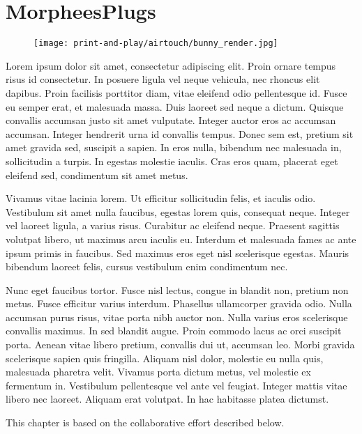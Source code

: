 \chapter{MorpheesPlugs} \label{ch:morphees}
  \begin{figure}[h]
    \centering
    \texttt{[image: print-and-play/airtouch/bunny\_render.jpg]}
  \end{figure}

  Lorem ipsum dolor sit amet, consectetur adipiscing elit. Proin ornare tempus
  risus id consectetur. In posuere ligula vel neque vehicula, nec rhoncus elit
  dapibus. Proin facilisis porttitor diam, vitae eleifend odio pellentesque id.
  Fusce eu semper erat, et malesuada massa. Duis laoreet sed neque a dictum.
  Quisque convallis accumsan justo sit amet vulputate. Integer auctor eros ac
  accumsan accumsan. Integer hendrerit urna id convallis tempus. Donec sem est,
  pretium sit amet gravida sed, suscipit a sapien. In eros nulla, bibendum nec
  malesuada in, sollicitudin a turpis. In egestas molestie iaculis. Cras eros
  quam, placerat eget eleifend sed, condimentum sit amet metus.

  Vivamus vitae lacinia lorem. Ut efficitur sollicitudin felis, et iaculis odio.
  Vestibulum sit amet nulla faucibus, egestas lorem quis, consequat neque.
  Integer vel laoreet ligula, a varius risus. Curabitur ac eleifend neque.
  Praesent sagittis volutpat libero, ut maximus arcu iaculis eu. Interdum et
  malesuada fames ac ante ipsum primis in faucibus. Sed maximus eros eget nisl
  scelerisque egestas. Mauris bibendum laoreet felis, cursus vestibulum enim
  condimentum nec.

  Nunc eget faucibus tortor. Fusce nisl lectus, congue in blandit non, pretium
  non metus. Fusce efficitur varius interdum. Phasellus ullamcorper gravida
  odio. Nulla accumsan purus risus, vitae porta nibh auctor non. Nulla varius
  eros scelerisque convallis maximus. In sed blandit augue. Proin commodo lacus
  ac orci suscipit porta. Aenean vitae libero pretium, convallis dui ut,
  accumsan leo. Morbi gravida scelerisque sapien quis fringilla. Aliquam nisl
  dolor, molestie eu nulla quis, malesuada pharetra velit. Vivamus porta dictum
  metus, vel molestie ex fermentum in. Vestibulum pellentesque vel ante vel
  feugiat. Integer mattis vitae libero nec laoreet. Aliquam erat volutpat. In
  hac habitasse platea dictumst.

  \newpage

  This chapter is based on the collaborative effort described below.

